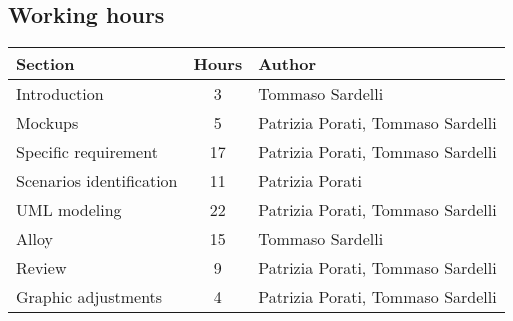 \subsection{Working hours}

\begin{center}
	\vspace{0.2cm}
	\begin{tabular}{ l c l } 
		\hline
		\textbf{Section}			& \textbf{Hours} & \textbf{Author} \\ 
		\hline
		Introduction				& 3 	& Tommaso Sardelli	\\
		Mockups     				& 5 	& Patrizia Porati, Tommaso Sardelli	\\
		Specific requirement 		& 17 	& Patrizia Porati, Tommaso Sardelli \\ 
		Scenarios identification	& 11 	& Patrizia Porati	\\
		UML modeling				& 22	& Patrizia Porati, Tommaso Sardelli	\\
		Alloy						& 15	& Tommaso Sardelli 	\\
		Review						& 9		& Patrizia Porati, Tommaso Sardelli	\\
		Graphic adjustments         & 4		& Patrizia Porati, Tommaso Sardelli	\\
		\hline
	\end{tabular}
\end{center}

